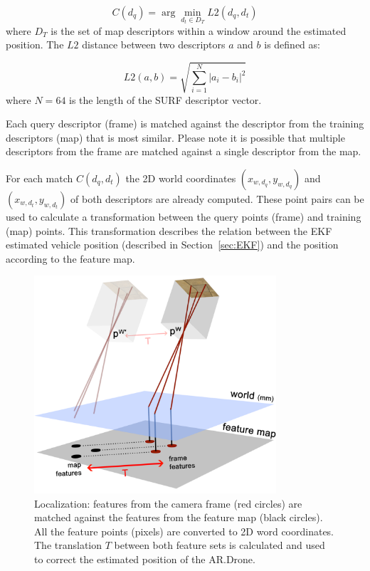 \begin{equation}
C(d_q) = \arg\min_{d_t \in D_T} L2(d_q, d_t)
\end{equation}
where $D_T$ is the set of map descriptors within a window around the estimated position.
The $L2$ distance between two descriptors $a$ and $b$ is defined as:

\begin{equation}
L2(a,b) =\sqrt { \sum_{i=1}^{N} \left| a_i - b_i \right| ^2 }
\end{equation}
where $N = 64$ is the length of the SURF descriptor vector.

Each query descriptor (frame) is matched against the descriptor from the training descriptors (map) that is most similar.
Please note it is possible that multiple descriptors from the frame are matched against a single descriptor from the map.

For each match $C(d_q, d_t)$ the 2D world coordinates $(x_{w, d_q}, y_{w, d_q})$ and $(x_{w, d_t}, y_{w, d_t})$ of both descriptors are already computed.
These point pairs can be used to calculate a transformation between the query points (frame) and training (map) points.
This transformation describes the relation between the EKF estimated vehicle position (described in Section~\ref{sec:EKF}) and the position according to the feature map.

\begin{figure}[htb]
\centering
\includegraphics[width=9cm]{images/localization1.png}
\caption{Localization: features from the camera frame (red circles) are matched against the features from the feature map (black circles). All the feature points (pixels) are converted to 2D word coordinates. The translation $T$ between both feature sets is calculated and used to correct the estimated position of the AR.Drone.}
\label{fig:localization1}
\end{figure}

